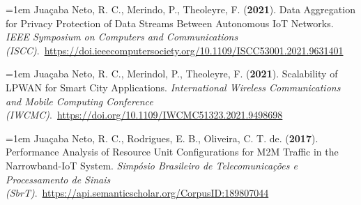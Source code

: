 
{\small

\hangindent=1em
Juaçaba Neto, R. C., Merindo, P., Theoleyre, F. (\textbf{2021}). Data Aggregation for Privacy Protection of Data Streams Between Autonomous IoT Networks. \textit{IEEE Symposium on Computers and Communications (ISCC)}.\ \url{https://doi.ieeecomputersociety.org/10.1109/ISCC53001.2021.9631401}
\enskip{}

\hangindent=1em
Juaçaba Neto, R. C., Merindol, P., Theoleyre, F. (\textbf{2021}). Scalability of LPWAN for Smart City Applications. \textit{International Wireless Communications and Mobile Computing Conference (IWCMC)}.\ \url{https://doi.org/10.1109/IWCMC51323.2021.9498698}
\enskip{}


\hangindent=1em
Juaçaba Neto, R. C., Rodrigues, E. B., Oliveira, C. T. de. (\textbf{2017}). Performance Analysis of Resource Unit Configurations for M2M Traffic in the Narrowband-IoT System. \textit{Simpósio Brasileiro de Telecomunicações e Processamento de Sinais (SbrT)}.\ \url{https://api.semanticscholar.org/CorpusID:189807044}

}
